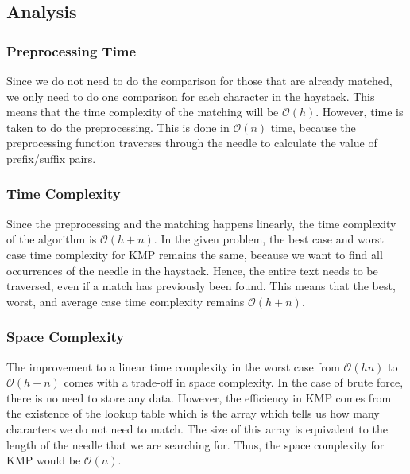 \subsection*{Analysis}

\subsubsection{Preprocessing Time}
Since we do not need to do the comparison for those that are already matched, we only need to do one comparison for each character in the haystack. This means that the time complexity of the matching will be $\mathcal{O}(h)$. However, time is taken to do the preprocessing. This is done in $\mathcal{O}(n)$ time, because the preprocessing function traverses through the needle to calculate the value of prefix/suffix pairs.

\subsubsection{Time Complexity}
Since the preprocessing and the matching happens linearly, the time complexity of the algorithm is $\mathcal{O}(h+n)$. In the given problem, the best case and worst case time complexity for KMP remains the same, because we want to find all occurrences of the needle in the haystack. Hence, the entire text needs to be traversed, even if a match has previously been found. This means that the best, worst, and average case time complexity remains $\mathcal{O}(h+n)$.

\subsubsection{Space Complexity}
The improvement to a linear time complexity in the worst case from $\mathcal{O}(hn)$ to $\mathcal{O}(h + n)$ comes with a trade-off in space complexity. In the case of brute force, there is no need to store any data. However, the efficiency in KMP comes from the existence of the lookup table which is the array which tells us how many characters we do not need to match. The size of this array is equivalent to the length of the needle that we are searching for. Thus, the space complexity for KMP would be $\mathcal{O}(n)$.

